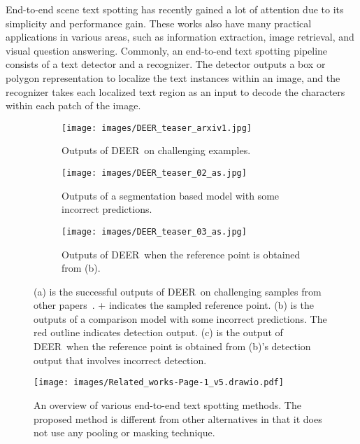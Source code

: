 \documentclass[10pt,twocolumn,letterpaper]{article}
\newcommand{\methodname}[0]{DEER}
\begin{document}
End-to-end scene text spotting has recently gained a lot of attention due to its simplicity and performance gain. These works also have many practical applications in various areas, such as information extraction, image retrieval, and visual question answering. Commonly, an end-to-end text spotting pipeline consists of a text detector and a recognizer. The detector outputs a box or polygon representation to localize the text instances within an image, and the recognizer takes each localized text region as an input to decode the characters within each patch of the image.








\begin{figure}[t]
  \centering
  \begin{subfigure}{0.98\linewidth}
\texttt{[image: images/DEER\_teaser\_arxiv1.jpg]}
    \caption{Outputs of \methodname~on challenging examples.}
    \label{fig:teaser_successful}
  \end{subfigure}
\begin{subfigure}{0.46\linewidth}
\texttt{[image: images/DEER\_teaser\_02\_as.jpg]}
    \caption{Outputs of a segmentation based model with some incorrect predictions.}
    \label{fig:teaser_mts}
  \end{subfigure}
\begin{subfigure}{0.46\linewidth}
\texttt{[image: images/DEER\_teaser\_03\_as.jpg]}
    \caption{Outputs of \methodname~when the reference point is obtained from (b).}
    \label{fig:teaser_mts_deer}
  \end{subfigure}
   \caption{(a) is the successful outputs of \methodname~on challenging samples from other papers~\cite{baek2020character,liao2020mask}. + indicates the sampled reference point. (b) is the outputs of a comparison model with some incorrect predictions. The red outline indicates detection output. (c) is the output of \methodname~when the reference point is obtained from (b)'s detection output that involves incorrect detection.}
    \label{fig:teaser}
\end{figure}

\begin{figure*}[t]
\begin{center}
\texttt{[image: images/Related\_works-Page-1\_v5.drawio.pdf]}
\end{center}
\caption{An overview of various end-to-end text spotting methods. The proposed method is different from other alternatives in that it does not use any pooling or masking technique.}
\label{fig:related_works}
\end{figure*}
\end{document}
